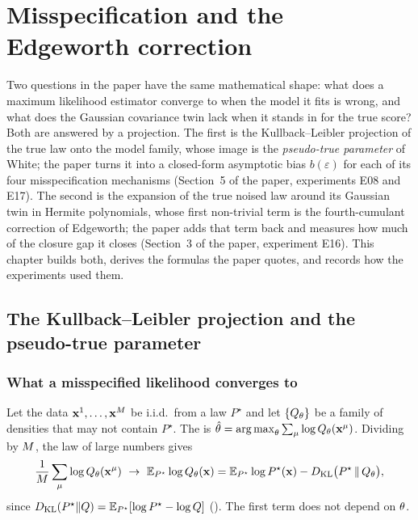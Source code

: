 \chapter{Misspecification and the Edgeworth correction}
\label{ch:misspecification-edgeworth}

Two questions in the paper have the same mathematical shape: what does a maximum
likelihood estimator converge to when the model it fits is wrong, and what does the
Gaussian covariance twin lack when it stands in for the true score? Both are answered
by a projection. The first is the Kullback--Leibler projection of the true law onto the
model family, whose image is the \emph{pseudo-true parameter} of White; the paper turns
it into a closed-form asymptotic bias $b(\varepsilon)$ for each of its four
misspecification mechanisms (Section~5 of the paper, experiments E08 and E17). The second
is the expansion of the true noised law around its Gaussian twin in Hermite polynomials,
whose first non-trivial term is the fourth-cumulant correction of Edgeworth; the paper
adds that term back and measures how much of the closure gap it closes (Section~3 of the
paper, experiment E16). This chapter builds both, derives the formulas the paper quotes,
and records how the experiments used them.

\section{The Kullback--Leibler projection and the pseudo-true parameter}
\label{sec:kl-projection}

\subsection{What a misspecified likelihood converges to}

Let the data $\mathbf{x}^1,\dots,\mathbf{x}^{M}$ be i.i.d.\ from a law $P^\star$ and let
$\{Q_\theta\}$ be a family of densities that may not contain $P^\star$. The
 is
$\hat{\theta}=\operatorname*{arg\,max}_\theta\sum_\mu\log Q_\theta(\mathbf{x}^\mu)$. Dividing by $M$, the
law of large numbers gives
\begin{equation}
  \frac1\nseq\sum_\mu\log Q_\params(\vx^\mu)\ \to\ \E_{P^\star}\log Q_\params(\vx)
  =\E_{P^\star}\log P^\star(\vx)-\KL\bigl(P^\star\,\|\,Q_\params\bigr),
  \label{eq:pop-loglik}
\end{equation}
since $D_{\mathrm{KL}}(P^\star\|Q)=\mathbb{E}_{P^\star}[\log P^\star-\log Q]$ (). The first
term does not depend on $\theta$.

